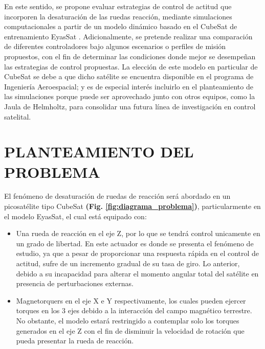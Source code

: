 En este sentido, se propone evaluar estrategias de control de actitud que incorporen la desaturación de las ruedas reacción, mediante simulaciones computacionales a partir de un modelo dinámico basado en el CubeSat de entrenamiento EyasSat \cite{Eyassat}. Adicionalmente, se pretende realizar una comparación de diferentes controladores bajo algunos escenarios o perfiles de misión propuestos, con el fin de determinar las condiciones donde mejor se desempeñan las estrategias de control propuestas. La elección de este modelo en particular de CubeSat se debe a que dicho satélite se encuentra disponible en el programa de Ingeniería Aeroespacial; y es de especial interés incluirlo en el planteamiento de las simulaciones porque puede ser aprovechado junto con otros equipos, como la Jaula de Helmholtz, para consolidar una futura línea de investigación en control satelital.


\newpage


\section{PLANTEAMIENTO DEL PROBLEMA}


El fenómeno de desaturación de ruedas de reacción será abordado en un picosatélite tipo CubeSat \textbf{(Fig. \ref{fig:diagrama_problema})}, particularmente en el modelo EyasSat, el cual está equipado con:

\begin{itemize}

\item Una rueda de reacción en el eje Z, por lo que se tendrá control unicamente en un grado de libertad. En este actuador es donde se presenta el fenómeno de estudio, ya que a pesar de proporcionar una respuesta rápida en el control de actitud, sufre de un incremento gradual de su tasa de giro. Lo anterior, debido a su incapacidad para alterar el momento angular total del satélite en presencia de perturbaciones externas. 
 
\item Magnetorquers en el eje X e Y respectivamente, los cuales pueden ejercer torques en los 3 ejes debido a la interacción del campo magnético terrestre. No obstante, el modelo estará restringido a contemplar solo los torques generados en el eje Z con el fin de disminuir la velocidad de rotación que pueda presentar la rueda de reacción. 

\end{itemize}

